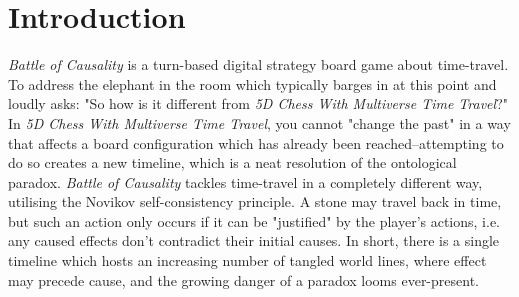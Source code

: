 \documentclass[12pt]{article}
\begin{document}
	\section{Introduction}
	\textit{Battle of Causality} is a turn-based digital strategy board game about time-travel. To address the elephant in the room which typically barges in at this point and loudly asks: "So how is it different from \textit{5D Chess With Multiverse Time Travel}?" In \textit{5D Chess With Multiverse Time Travel}, you cannot "change the past" in a way that affects a board configuration which has already been reached--attempting to do so creates a new timeline, which is a neat resolution of the ontological paradox. \textit{Battle of Causality} tackles time-travel in a completely different way, utilising the Novikov self-consistency principle. A stone may travel back in time, but such an action only occurs if it can be "justified" by the player's actions, i.e. any caused effects don't contradict their initial causes. In short, there is a single timeline which hosts an increasing number of tangled world lines, where effect may precede cause, and the growing danger of a paradox looms ever-present.
	
\end{document}
